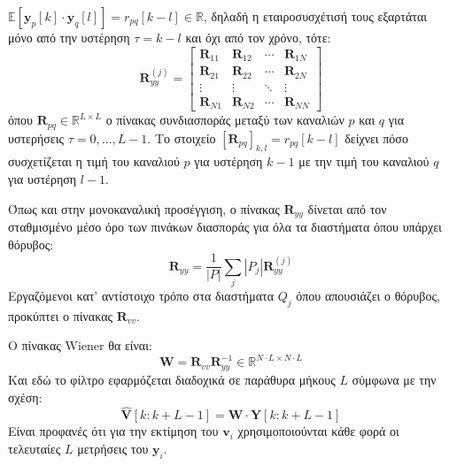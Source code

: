 \documentclass[a4paper,12pt]{article}
\begin{document}
$\mathbb{E}[\mathbf{y}_p[k] \cdot \mathbf{y}_q[l]] = r_{pq}[k-l] \in \mathbb{R}$, δηλαδή η 
εταιροσυσχέτισή τους εξαρτάται μόνο από την υστέρηση $\tau = k - l$ και όχι από τον χρόνο, τότε:
\[
\mathbf{R}_{yy}^{(j)} =
\begin{bmatrix}
    \mathbf{R}_{11} & \mathbf{R}_{12} & \cdots & \mathbf{R}_{1N} \\
    \mathbf{R}_{21} & \mathbf{R}_{22} & \cdots & \mathbf{R}_{2N} \\
    \vdots & \vdots & \ddots & \vdots \\
    \mathbf{R}_{N1} & \mathbf{R}_{N2} & \cdots & \mathbf{R}_{NN}
\end{bmatrix}
\]
όπου $\mathbf{R}_{pq} \in \mathbb{R}^{L \times L}$ ο πίνακας συνδιασποράς μεταξύ των καναλιών $p$ και $q$
για υστερήσεις $\tau = 0,\ldots,L-1$. Το στοιχείο $[\mathbf{R}_{pq}]_{k,l} = r_{pq}[k-l]$ δείχνει πόσο 
συσχετίζεται η τιμή του καναλιού $p$ για υστέρηση $k-1$ με την τιμή του καναλιού $q$ για υστέρηση $l-1$.

Όπως και στην μονοκαναλική προσέγγιση, ο πίνακας $\mathbf{R}_{yy}$ δίνεται από τον σταθμισμένο μέσο όρο 
των πινάκων διασποράς για όλα τα διαστήματα όπου υπάρχει θόρυβος:
\[
\mathbf{R}_{yy} = \frac{1}{|P|} \sum_j |P_j| \mathbf{R}_{yy}^{(j)}
\]
Εργαζόμενοι κατ' αντίστοιχο τρόπο στα διαστήματα $Q_j$ όπου απουσιάζει ο θόρυβος, προκύπτει ο πίνακας 
$\mathbf{R}_{vv}$.

Ο πίνακας Wiener θα είναι:
\[
\mathbf{W} = \mathbf{R}_{vv}\mathbf{R}_{yy}^{-1} \in \mathbb{R}^{N \cdot L \times N \cdot L}
\]
Και εδώ το φίλτρο εφαρμόζεται διαδοχικά σε παράθυρα μήκους $L$ σύμφωνα με την σχέση:
\[
\hat{\mathbf{V}}[k:k+L-1] = \mathbf{W} \cdot \mathbf{Y}[k:k+L-1]
\] 
Είναι προφανές ότι για την εκτίμηση του $\mathbf{v}_i$ χρησιμοποιούνται κάθε φορά οι τελευταίες $L$
μετρήσεις του $\mathbf{y}_i$.
\end{document}
